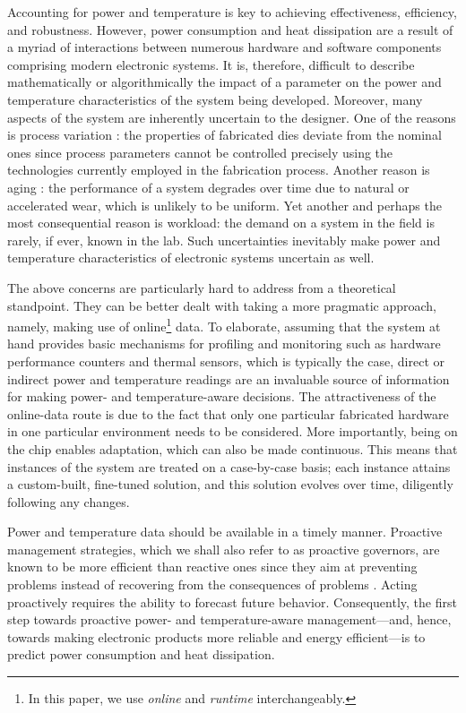 Accounting for power and temperature is key to achieving effectiveness,
efficiency, and robustness. However, power consumption and heat dissipation are
a result of a myriad of interactions between numerous hardware and software
components comprising modern electronic systems. It is, therefore, difficult to
describe mathematically or algorithmically the impact of a parameter on the
power and temperature characteristics of the system being developed. Moreover,
many aspects of the system are inherently uncertain to the designer. One of the
reasons is process variation \cite{chandrakasan2000}: the properties of
fabricated dies deviate from the nominal ones since process parameters cannot be
controlled precisely using the technologies currently employed in the
fabrication process. Another reason is aging \cite{coskun2006}: the performance
of a system degrades over time due to natural or accelerated wear, which is
unlikely to be uniform. Yet another and perhaps the most consequential reason is
workload: the demand on a system in the field is rarely, if ever, known in the
lab. Such uncertainties inevitably make power and temperature characteristics of
electronic systems uncertain as well.

The above concerns are particularly hard to address from a theoretical
standpoint. They can be better dealt with taking a more pragmatic approach,
namely, making use of online\footnote{In this paper, we use \emph{online} and
\emph{runtime} interchangeably.} data. To elaborate, assuming that the system at
hand provides basic mechanisms for profiling and monitoring such as hardware
performance counters and thermal sensors, which is typically the case, direct or
indirect power and temperature readings are an invaluable source of information
for making power- and temperature-aware decisions. The attractiveness of the
online-data route is due to the fact that only one particular fabricated
hardware in one particular environment needs to be considered. More importantly,
being on the chip enables adaptation, which can also be made continuous. This
means that instances of the system are treated on a case-by-case basis; each
instance attains a custom-built, fine-tuned solution, and this solution evolves
over time, diligently following any changes.

Power and temperature data should be available in a timely manner. Proactive
management strategies, which we shall also refer to as proactive governors, are
known to be more efficient than reactive ones since they aim at preventing
problems instead of recovering from the consequences of problems
\cite{chaudhry2015, coskun2008}. Acting proactively requires the ability to
forecast future behavior. Consequently, the first step towards proactive power-
and temperature-aware management---and, hence, towards making electronic
products more reliable and energy efficient---is to predict power consumption
and heat dissipation.

